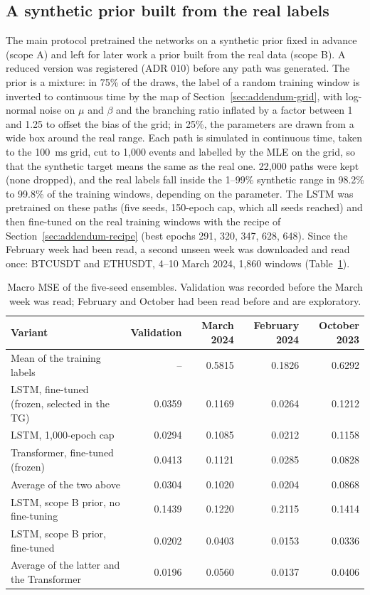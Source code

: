\subsection{A synthetic prior built from the real labels}
\label{sec:addendum-scope-b}

The main protocol pretrained the networks on a synthetic prior fixed in advance (scope A)
and left for later work a prior built from the real data (scope B). A reduced version was
registered (ADR 010) before any path was generated. The prior is a mixture: in 75\% of the
draws, the label of a random training window is inverted to continuous time by the map of
Section~\ref{sec:addendum-grid}, with log-normal noise on $\mu$ and $\beta$ and the
branching ratio inflated by a factor between 1 and 1.25 to offset the bias of the grid; in
25\%, the parameters are drawn from a wide box around the real range. Each path is simulated
in continuous time, taken to the 100~ms grid, cut to 1,000 events and labelled by the MLE on
the grid, so that the synthetic target means the same as the real one.
22,000 paths were kept (none dropped), and the real
labels fall inside the 1--99\% synthetic range in
98.2\% to
99.8\% of the training windows,
depending on the parameter. The LSTM was pretrained on these paths (five seeds, 150-epoch
cap, which all seeds reached) and then fine-tuned on the real training windows with the
recipe of Section~\ref{sec:addendum-recipe} (best epochs 291, 320, 347, 628, 648).
Since the February week had been read, a second unseen week was downloaded and read once:
BTCUSDT and ETHUSDT, 4--10 March 2024, 1,860 windows
(Table~\ref{tab:addendum-scope-b}).

\begin{table}[htbp]
\centering
\caption{Macro MSE of the five-seed ensembles. Validation was recorded before the March week
was read; February and October had been read before and are exploratory.}
\label{tab:addendum-scope-b}
\footnotesize
\begin{tabular}{lrrrr}
\toprule
Variant & Validation & March 2024 & February 2024 & October 2023 \\
\midrule
Mean of the training labels & -- & 0.5815 & 0.1826 & 0.6292 \\
LSTM, fine-tuned (frozen, selected in the TG) & 0.0359 & 0.1169 & 0.0264 & 0.1212 \\
LSTM, 1,000-epoch cap & 0.0294 & 0.1085 & 0.0212 & 0.1158 \\
Transformer, fine-tuned (frozen) & 0.0413 & 0.1121 & 0.0285 & 0.0828 \\
Average of the two above & 0.0304 & 0.1020 & 0.0204 & 0.0868 \\
LSTM, scope B prior, no fine-tuning & 0.1439 & 0.1220 & 0.2115 & 0.1414 \\
LSTM, scope B prior, fine-tuned & 0.0202 & 0.0403 & 0.0153 & 0.0336 \\
Average of the latter and the Transformer & 0.0196 & 0.0560 & 0.0137 & 0.0406 \\
\bottomrule
\end{tabular}
\end{table}

